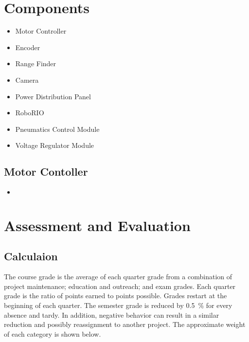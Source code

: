 \documentclass[letterpaper,10pt]{memoir}
\begin{document}
\chapter{Components}

\begin{itemize}
\item Motor Controller
\item Encoder
\item Range Finder
\item Camera
\item Power Distribution Panel
\item RoboRIO
\item Pneumatics Control Module
\item Voltage Regulator Module
\end{itemize}


\section*{Motor Contoller}

\begin{itemize}
\item 
\end{itemize}





% 


% 

\raggedbottom

\chapter{Assessment and Evaluation}

\section*{Calculaion}


The course grade is the average of each quarter grade from a combination of project maintenance; education and outreach; and exam grades.
%
Each quarter grade is the ratio of points earned to points possible.
%
Grades restart at the beginning of each quarter.
%
The semester grade is reduced by \SI{0.5}{\percent} for every absence and tardy.  In addition, negative behavior can result in a similar reduction and possibly reassignment to another project.
%
The approximate weight of each category is shown below.
\end{document}
